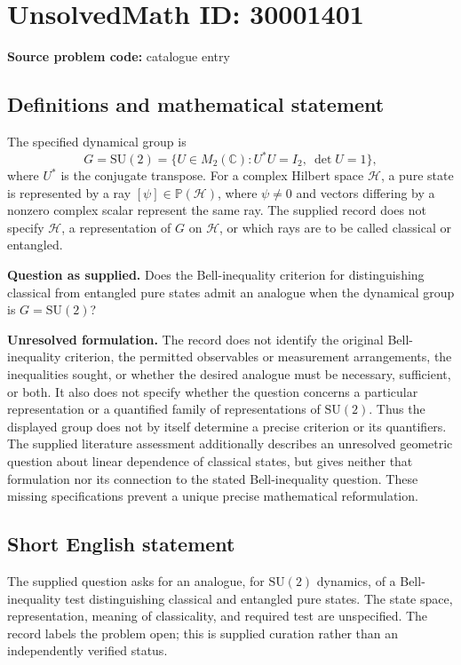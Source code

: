 \documentclass[11pt]{article}
\newcommand{\C}{\mathbb{C}}
\newcommand{\PP}{\mathbb{P}}
\begin{document}
\section*{UnsolvedMath ID: 30001401}
\textbf{Source problem code:} catalogue entry
\subsection{Definitions and mathematical statement}
The specified dynamical group is
\[
G=\mathrm{SU}(2)=\{U\in M_2(\C):U^*U=I_2,\ \det U=1\},
\]
where \(U^*\) is the conjugate transpose. For a complex Hilbert space \(\mathcal H\), a pure state is represented by a ray \([\psi]\in\PP(\mathcal H)\), where \(\psi\ne0\) and vectors differing by a nonzero complex scalar represent the same ray. The supplied record does not specify \(\mathcal H\), a representation of \(G\) on \(\mathcal H\), or which rays are to be called classical or entangled.

\textbf{Question as supplied.} Does the Bell-inequality criterion for distinguishing classical from entangled pure states admit an analogue when the dynamical group is \(G=\mathrm{SU}(2)\)?

\textbf{Unresolved formulation.} The record does not identify the original Bell-inequality criterion, the permitted observables or measurement arrangements, the inequalities sought, or whether the desired analogue must be necessary, sufficient, or both. It also does not specify whether the question concerns a particular representation or a quantified family of representations of \(\mathrm{SU}(2)\). Thus the displayed group does not by itself determine a precise criterion or its quantifiers. The supplied literature assessment additionally describes an unresolved geometric question about linear dependence of classical states, but gives neither that formulation nor its connection to the stated Bell-inequality question. These missing specifications prevent a unique precise mathematical reformulation.
\subsection{Short English statement}
The supplied question asks for an analogue, for \(\mathrm{SU}(2)\) dynamics, of a Bell-inequality test distinguishing classical and entangled pure states. The state space, representation, meaning of classicality, and required test are unspecified. The record labels the problem open; this is supplied curation rather than an independently verified status.
\end{document}
